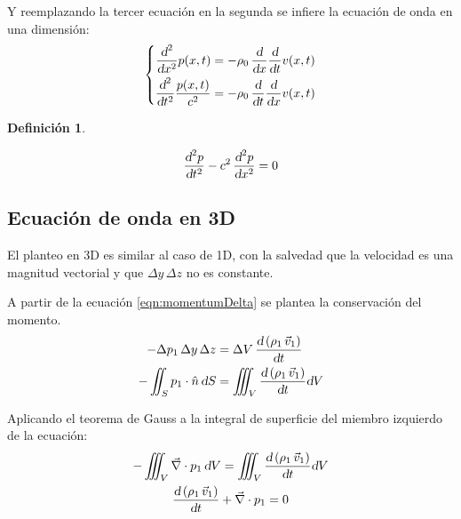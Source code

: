 \documentclass[a5paper,12pt,twoside]{book}
\newtheorem{defn}{{Definición}}[chapter]
\begin{document}
Y reemplazando la tercer ecuación en la segunda se infiere la ecuación de onda en una dimensión:
\begin{equation*}
    \left\{
    \begin{aligned}
        \frac{\textsl{d}^2}{\textsl{d} x^2} p(x,t) &= - \rho_0 \, \frac{\textsl{d}}{\textsl{d} x} \frac{\textsl{d}}{\textsl{d} t} v(x,t)
        \\
        \frac{\textsl{d}^2}{\textsl{d} t^2} \frac{p(x,t)}{c^2} &= - \rho_0 \, \frac{\textsl{d}}{\textsl{d} t} \frac{\textsl{d}}{\textsl{d} x} v(x,t)
    \end{aligned}
    \right.
\end{equation*}

\begin{mdframed}[style=MyFrame1]
    \begin{defn}
        \label{defn:soundWave1D}
    \end{defn}
    \begin{equation*}
        \frac{\textsl{d}^2 p}{\textsl{d} t^2} - c^2 \, \frac{\textsl{d}^2 p}{\textsl{d} x^2} = 0
    \end{equation*}
\end{mdframed}


\subsection{Ecuación de onda en 3D}

El planteo en 3D es similar al caso de 1D, con la salvedad que la velocidad es una magnitud vectorial y que $\Delta y \, \Delta z$ no es constante.

A partir de la ecuación \ref{eqn:momentumDelta} se plantea la conservación del momento.
\begin{align*}
    - \Delta p_1 \, \Delta y \, \Delta z
    &=
    \Delta V \, \frac{\textsl{d} \left( \rho_1 \, \Vec{v}_1 \right)}{\textsl{d} t}
    \\
    - \iint_S p_1 \cdot \hat{n} \, \textsl{d} S
    &= \iiint_V \frac{\textsl{d} \left( \rho_1 \, \Vec{v}_1 \right)}{\textsl{d} t} \textsl{d} V
\end{align*}

Aplicando el teorema de Gauss a la integral de superficie del miembro izquierdo de la ecuación:
\begin{gather}
    - \iiint_V \Vec{\nabla} \cdot p_1 \, \textsl{d} V
    =
    \iiint_V \frac{\textsl{d} \left( \rho_1 \, \Vec{v}_1 \right)}{\textsl{d} t} \textsl{d} V
    \notag\\
    \frac{\textsl{d} \left( \rho_1 \, \Vec{v}_1 \right)}{\textsl{d} t} + \Vec{\nabla} \cdot p_1 = 0
    \label{eqn:momentum3D}
\end{gather}
\end{document}
